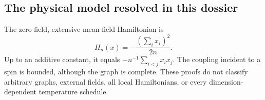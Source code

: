 \subsection{The physical model resolved in this dossier}

The zero-field, extensive mean-field Hamiltonian is
\[
 H_n(x)=-\frac{(\sum_i x_i)^2}{2n}.
\]
Up to an additive constant, it equals $-n^{-1}\sum_{i<j}x_ix_j$. The coupling incident to a spin is bounded, although the graph is complete. These proofs do not classify arbitrary graphs, external fields, all local Hamiltonians, or every dimension-dependent temperature schedule.
